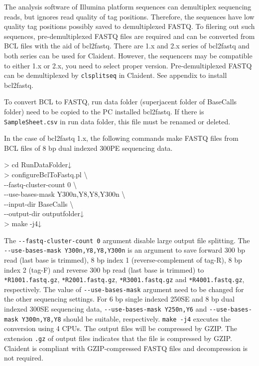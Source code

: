 \documentclass[titlepage,10pt,a4paper,english]{jsbook}
\newenvironment{cmd}{\begin{oframed}\raggedright\ttfamily\footnotesize\setlength{\baselineskip}{1.4em}}{\end{oframed}\vspace{-1em}}
\begin{document}
The analysis software of Illumina platform sequences can demultiplex sequencing reads, but ignores read quality of tag positions.
Therefore, the sequences have low quality tag positions possibly saved to demultiplexed FASTQ.
To filering out such sequences, pre-demultiplexed FASTQ files are required and can be converted from BCL files with the aid of bcl2fastq.
There are 1.x and 2.x series of bcl2fastq and both series can be used for Claident.
However, the sequencers may be compatible to either 1.x or 2.x, you need to select proper version.
Pre-demultiplexed FASTQ can be demultiplexed by \texttt{clsplitseq} in Claident.
See appendix to install bcl2fastq.

To convert BCL to FASTQ, run data folder (superjacent folder of BaseCalls folder) need to be copied to the PC installed bcl2fastq.
If there is \texttt{SampleSheet.csv} in run data folder, this file must be renamed or deleted.

In the case of bcl2fastq 1.x, the following commands make FASTQ files from BCL files of 8 bp dual indexed 300PE sequencing data.
\begin{cmd}
{\textgreater} cd RunDataFolder↓\\
{\textgreater} configureBclToFastq.pl {\textbackslash}\\
{-}{-}fastq-cluster-count 0 {\textbackslash}\\
{-}{-}use-bases-mask Y300n,Y8,Y8,Y300n {\textbackslash}\\
{-}{-}input-dir BaseCalls {\textbackslash}\\
{-}{-}output-dir outputfolder↓\\
{\textgreater} make -j4↓
\end{cmd}
The \texttt{{-}{-}fastq-cluster-count 0} argument disable large output file splitting.
The \texttt{{-}{-}use-bases-mask Y300n,Y8,Y8,Y300n} is an argument to save forward 300 bp read (last base is trimmed), 8 bp index 1 (reverse-complement of tag-R), 8 bp index 2 (tag-F) and reverse 300 bp read (last base is trimmed) to \texttt{*{\textunderscore}R1{\textunderscore}001.fastq.gz}, \texttt{*{\textunderscore}R2{\textunderscore}001.fastq.gz}, \texttt{*{\textunderscore}R3{\textunderscore}001.fastq.gz} and \texttt{*{\textunderscore}R4{\textunderscore}001.fastq.gz}, respectively.
The value of \texttt{{-}{-}use-bases-mask} argument need to be changed for the other sequencing settings.
For 6 bp single indexed 250SE and 8 bp dual indexed 300SE sequencing data, \texttt{{-}{-}use-bases-mask Y250n,Y6} and \texttt{{-}{-}use-bases-mask Y300n,Y8,Y8} should be suitable, respectively.
\texttt{make -j4} executes the conversion using 4 CPUs.
The output files will be compressed by GZIP.
The extension \texttt{.gz} of output files indicates that the file is compressed by GZIP.
Claident is compliant with GZIP-compressed FASTQ files and decompression is not required.
\end{document}
